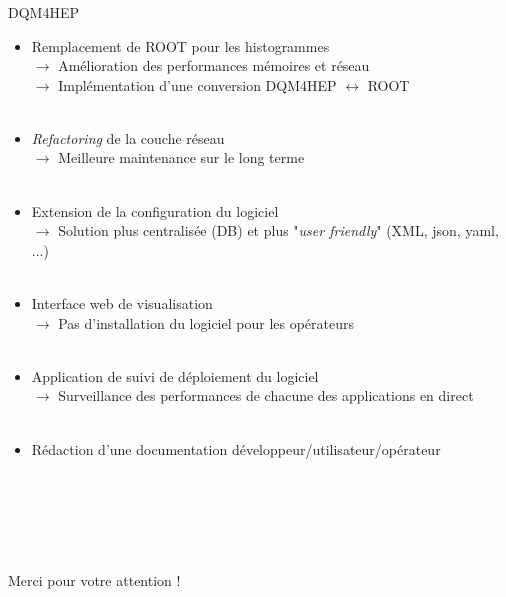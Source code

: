 \documentclass[8pt]{beamer}
\begin{document}
  \begin{frame}
    \frametitle{\secname}
    \framesubtitle{\subsecname}
    \begin{block}{DQM4HEP}
      \begin{itemize}
        \item Remplacement de ROOT pour les histogrammes \\
        $\rightarrow$ Amélioration des performances mémoires et réseau \\
        $\rightarrow$ Implémentation d'une conversion DQM4HEP $\leftrightarrow$ ROOT \\
        ~ \\
        \item \textit{Refactoring} de la couche réseau \\
        $\rightarrow$ Meilleure maintenance sur le long terme \\
        ~ \\
        \item Extension de la configuration du logiciel \\
        $\rightarrow$ Solution plus centralisée (DB) et plus "\textit{user friendly}" (XML, json, yaml, ...) \\
        ~ \\
        \item Interface web de visualisation \\
        $\rightarrow$ Pas d'installation du logiciel pour les opérateurs \\
        ~ \\
        \item Application de suivi de déploiement du logiciel \\
        $\rightarrow$ Surveillance des performances de chacune des applications en direct \\
        ~ \\
        \item Rédaction d'une documentation développeur/utilisateur/opérateur
      \end{itemize}
    \end{block}
  \end{frame}


  \begin{frame}
    \begin{center}
      ~ \\
      ~ \\
      ~ \\
      ~ \\
      ~ \\
      \Large Merci pour votre attention !
    \end{center}
  \end{frame}
\end{document}
